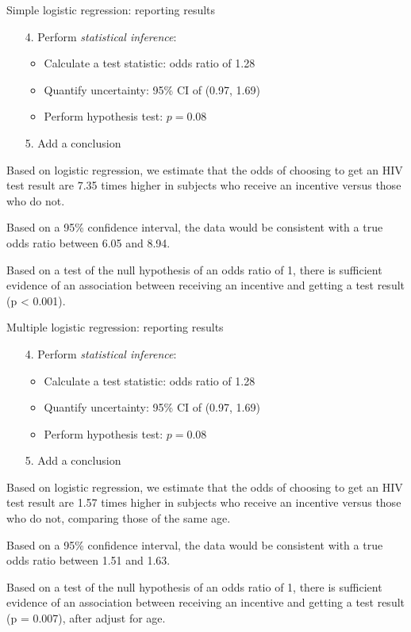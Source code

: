 \documentclass[10pt,t]{beamer}
\begin{document}
\begin{frame}{Simple logistic regression: reporting results}
	\begin{enumerate}
		\item[4.] Perform \textit{statistical inference}:
		\begin{itemize}
			\item Calculate a test statistic: odds ratio of 1.28
			\item Quantify uncertainty: 95\% CI of (0.97, 1.69)
			\item Perform hypothesis test: $p = 0.08$
		\end{itemize}
		\item[5.] Add a conclusion
	\end{enumerate}

	Based on logistic regression, we estimate that the odds of choosing to get an HIV test result are 7.35 times higher in subjects who receive an incentive versus those who do not. 
	
	\medskip
	
	Based on a 95\% confidence interval, the data would be consistent with a true odds ratio between 6.05 and 8.94. 
	
	\medskip
	
	Based on a test of the null hypothesis of an odds ratio of 1, there is sufficient evidence of an association between receiving an incentive and getting a test result (p < 0.001). 
\end{frame}

\begin{frame}{Multiple logistic regression: reporting results}
	\vspace{-5mm}
	
	\begin{enumerate}
		\item[4.] Perform \textit{statistical inference}:
		\begin{itemize}
			\item Calculate a test statistic: odds ratio of 1.28
			\item Quantify uncertainty: 95\% CI of (0.97, 1.69)
			\item Perform hypothesis test: $p = 0.08$
		\end{itemize}
		\item[5.] Add a conclusion
	\end{enumerate}

\medskip
	
	Based on logistic regression, we estimate that the odds of choosing to get an HIV test result are 1.57 times higher in subjects who receive an incentive versus those who do not, comparing those of the same age. 
	
	\medskip
	
	Based on a 95\% confidence interval, the data would be consistent with a true odds ratio between 1.51 and 1.63. 
	
	\medskip
	
	Based on a test of the null hypothesis of an odds ratio of 1, there is sufficient evidence of an association between receiving an incentive and getting a test result (p = 0.007), after adjust for age. 
\end{frame}
\end{document}
